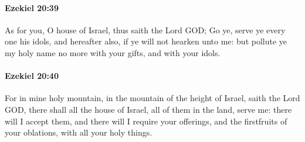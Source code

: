 		\paragraph{Ezekiel 20:39} %
			\label{EZEKIEL-20-39}

			As for you, O house of Israel, thus saith the Lord GOD; Go ye, serve ye every one his idols, and hereafter also, if ye will not hearken unto me: but pollute ye my holy name no more with your gifts, and with your idols.


		\paragraph{Ezekiel 20:40} %
			\label{EZEKIEL-20-40}

			For in mine holy mountain, in the mountain of the height of Israel, saith the Lord GOD, there shall all the house of Israel, all of them in the land, serve me: there will I accept them, and there will I require your offerings, and the firstfruits of your oblations, with all your holy things.

